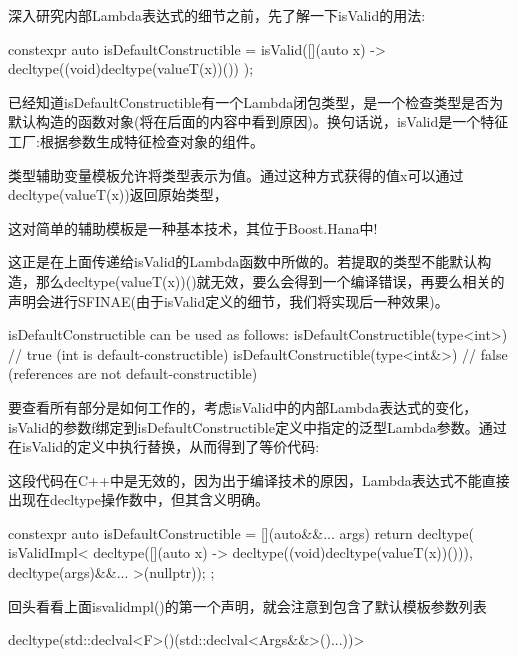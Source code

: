 深入研究内部Lambda表达式的细节之前，先了解一下isValid的用法:

\begin{cpp}
constexpr auto isDefaultConstructible
	= isValid([](auto x) -> decltype((void)decltype(valueT(x))()) {
		});
\end{cpp}

已经知道isDefaultConstructible有一个Lambda闭包类型，是一个检查类型是否为默认构造的函数对象(将在后面的内容中看到原因)。换句话说，isValid是一个特征工厂:根据参数生成特征检查对象的组件。

类型辅助变量模板允许将类型表示为值。通过这种方式获得的值x可以通过decltype(valueT(x))返回原始类型，

\begin{notice}这对简单的辅助模板是一种基本技术，其位于Boost.Hana中!
\end{notice}

这正是在上面传递给isValid的Lambda函数中所做的。若提取的类型不能默认构造，那么decltype(valueT(x))()就无效，要么会得到一个编译错误，再要么相关的声明会进行SFINAE(由于isValid定义的细节，我们将实现后一种效果)。

\begin{cpp}
isDefaultConstructible can be used as follows:
isDefaultConstructible(type<int>) // true (int is default-constructible)
isDefaultConstructible(type<int&>) // false (references are not default-constructible)
\end{cpp}

要查看所有部分是如何工作的，考虑isValid中的内部Lambda表达式的变化，isValid的参数f绑定到isDefaultConstructible定义中指定的泛型Lambda参数。通过在isValid的定义中执行替换，从而得到了等价代码:

\begin{notice}这段代码在C++中是无效的，因为出于编译技术的原因，Lambda表达式不能直接出现在decltype操作数中，但其含义明确。
\end{notice}

\begin{cpp}
constexpr auto isDefaultConstructible
= [](auto&&... args) {
	return decltype(
	isValidImpl<
	decltype([](auto x)
	-> decltype((void)decltype(valueT(x))())),
	decltype(args)&&...
	>(nullptr)){};
};
\end{cpp}

回头看看上面isvalidmpl()的第一个声明，就会注意到包含了默认模板参数列表

\begin{cpp}
decltype(std::declval<F>()(std::declval<Args&&>()...))>
\end{cpp}

